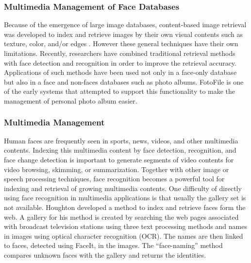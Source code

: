 \subsubsection{Multimedia Management of Face Databases}
Because of the emergence of large image databases, content-based
image retrieval was developed to index and retrieve images by their
own visual contents such as texture, color, and/or edges
\cite{mottaleb00, mottaleb97}. However these general techniques have
their own limitations. Recently, researchers have combined
traditional retrieval methods with face detection and recognition in
order to improve the retrieval accuracy. Applications of such
methods have been used not only in a face-only database but also in
a face and non-faces databases such as photo albums. FotoFile
\cite{kuchinskey99} is one of the early systems that attempted to
support this functionality to make the management of personal photo
album easier.

\subsubsection{Multimedia Management}
Human faces are frequently seen in sports, news, videos, and other
multimedia contents. Indexing this multimedia content by face
detection, recognition, and face change detection is important to
generate segments of video contents for video browsing, skimming, or
summarization. Together with other image or speech processing
techniques, face recognition becomes a powerful tool for indexing
and retrieval of growing multimedia contents. One difficulty of
directly using face recognition in multimedia applications is that
usually the gallery set is not available. Houghton \cite{Houghton99}
developed a method to index and retrieve faces form the web. A
gallery for his method is created by searching the web pages
associated with broadcast television stations using three text
processing methods and names in images using optical character
recognition (OCR). The names are then linked to faces, detected
using FaceIt, in the images. The ``face-naming'' method compares
unknown faces with the gallery and returns the identities.

